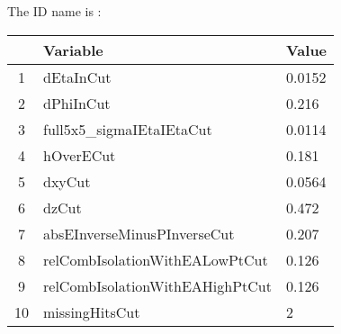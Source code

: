 \footnotesize
The ID name is
:%
\renewcommand{\arraystretch}{1.0}
\begin{table}
  \begin{center}
    \begin{tabular}{c l l}
      \hline
      & Variable & Value \\
      \hline      
       1 & dEtaInCut                       & 0.0152  \\
       2 & dPhiInCut                       & 0.216   \\
       3 & full5x5\_sigmaIEtaIEtaCut       & 0.0114  \\
       4 & hOverECut                       & 0.181   \\ 
       5 & dxyCut                          & 0.0564  \\
       6 & dzCut                           & 0.472   \\ 
       7 & absEInverseMinusPInverseCut     & 0.207   \\ 
       8 & relCombIsolationWithEALowPtCut  & 0.126   \\ 
       9 & relCombIsolationWithEAHighPtCut & 0.126   \\ 
      10 & missingHitsCut                  & 2       \\
      \hline
    \end{tabular}
  \end{center}
\end{table}
\renewcommand{\arraystretch}{1}

